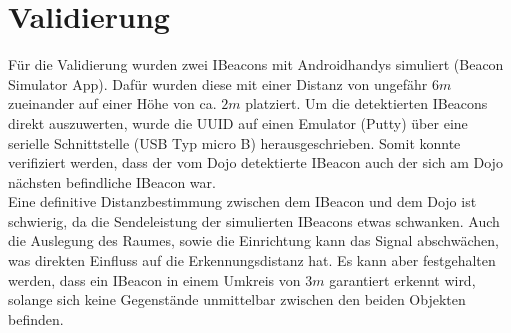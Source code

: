 \section{Validierung}
Für die Validierung wurden zwei IBeacons mit Androidhandys simuliert (Beacon Simulator App). Dafür wurden diese mit einer Distanz von ungefähr $6m$ zueinander auf einer Höhe von ca. $2m$ platziert. Um die detektierten IBeacons direkt auszuwerten, wurde die UUID auf einen Emulator (Putty) über eine serielle Schnittstelle (USB Typ micro B) herausgeschrieben. Somit konnte verifiziert werden, dass der vom Dojo detektierte IBeacon auch der sich am Dojo nächsten befindliche IBeacon war. 
\\[0.5cm]
Eine definitive Distanzbestimmung zwischen dem IBeacon und dem Dojo ist schwierig, da die Sendeleistung der simulierten IBeacons etwas schwanken. Auch die Auslegung des Raumes, sowie die Einrichtung kann das Signal abschwächen, was direkten Einfluss auf die Erkennungsdistanz hat. Es kann aber festgehalten werden, dass ein IBeacon in einem Umkreis von $3m$ garantiert erkennt wird, solange sich keine Gegenstände unmittelbar zwischen den beiden Objekten befinden.
